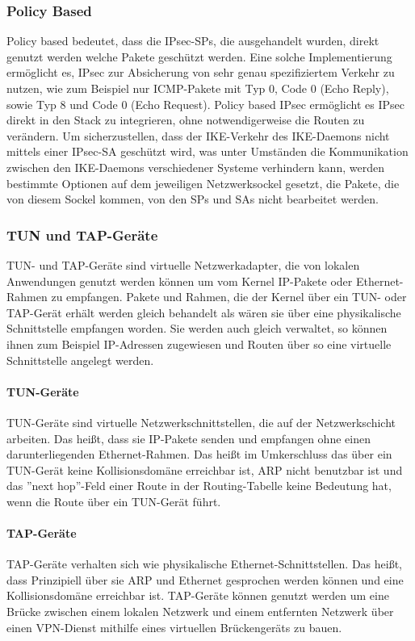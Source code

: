 \subsubsection{Policy Based}
\label{subsec:policybased}
Policy based bedeutet, dass die \ac{IPsec}-\acp{SP}, die ausgehandelt wurden, direkt genutzt werden welche Pakete geschützt werden.
Eine solche Implementierung ermöglicht es, \ac{IPsec} zur Absicherung von sehr genau spezifiziertem
Verkehr zu nutzen, wie zum Beispiel nur \ac{ICMP}-Pakete mit Typ 0, Code 0 (Echo Reply), sowie Typ 8 und Code 0 (Echo Request).
Policy based \ac{IPsec} ermöglicht es \ac{IPsec} direkt in den Stack zu integrieren, ohne notwendigerweise die Routen zu verändern.
Um sicherzustellen, dass der \ac{IKE}-Verkehr des \ac{IKE}-Daemons nicht mittels einer \ac{IPsec}-\ac{SA} geschützt wird, was
unter Umständen die Kommunikation zwischen den \ac{IKE}-Daemons verschiedener Systeme verhindern kann, werden bestimmte
Optionen auf dem jeweiligen Netzwerksockel gesetzt, die Pakete, die von diesem Sockel kommen, von den \acp{SP} und \acp{SA}
nicht bearbeitet werden.



\subsubsection{TUN und TAP-Geräte}
TUN- und TAP-Geräte sind virtuelle Netzwerkadapter, die von lokalen Anwendungen
genutzt werden können um vom Kernel \ac{IP}-Pakete oder Ethernet-Rahmen zu empfangen.
Pakete und Rahmen, die der Kernel über ein TUN- oder TAP-Gerät erhält
werden gleich behandelt als wären sie über eine physikalische Schnittstelle empfangen worden.
Sie werden auch gleich verwaltet, so können ihnen zum Beispiel \ac{IP}-Adressen zugewiesen
und Routen über so eine virtuelle Schnittstelle angelegt werden.

\paragraph{TUN-Geräte}
TUN-Geräte sind virtuelle Netzwerkschnittstellen, die auf der Netzwerkschicht arbeiten.
Das heißt, dass sie IP-Pakete senden und empfangen ohne einen darunterliegenden Ethernet-Rahmen.
Das heißt im Umkerschluss das über ein TUN-Gerät keine Kollisionsdomäne erreichbar ist,
ARP nicht benutzbar ist und das ''next hop''-Feld einer Route in der Routing-Tabelle
keine Bedeutung hat, wenn die Route über ein TUN-Gerät führt.

\paragraph{TAP-Geräte}
TAP-Geräte verhalten sich wie physikalische Ethernet-Schnittstellen.
Das heißt, dass Prinzipiell über sie ARP und Ethernet gesprochen werden können
und eine Kollisionsdomäne erreichbar ist. TAP-Geräte können genutzt werden
um eine Brücke zwischen einem lokalen Netzwerk und einem entfernten
Netzwerk über einen \ac{VPN}-Dienst mithilfe eines virtuellen Brückengeräts
zu bauen.
